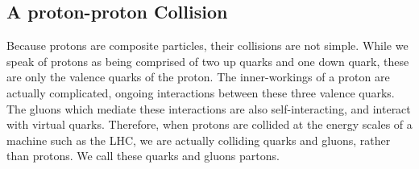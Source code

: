 \vspace{5mm}

\subsection{A proton-proton Collision}

Because protons are composite particles, their collisions are not simple. While we speak of protons as being comprised of two up quarks and one down quark, these are only the valence quarks of the proton. The inner-workings of a proton are actually complicated, ongoing interactions between these three valence quarks. The gluons which mediate these interactions are also self-interacting, and interact with virtual quarks. Therefore, when protons are collided at the energy scales of a machine such as the LHC, we are actually colliding quarks and gluons, rather than protons. We call these quarks and gluons partons.


